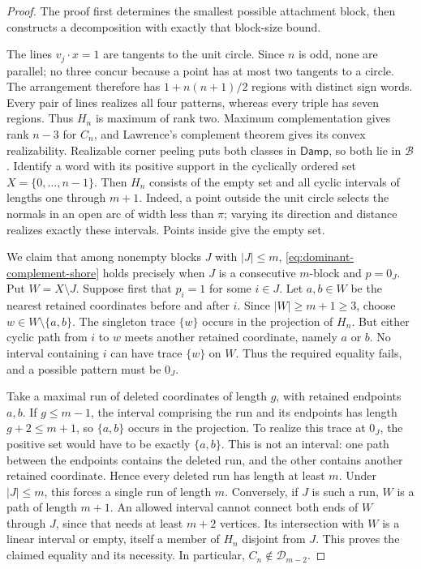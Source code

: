 \documentclass[11pt]{article}
\theoremstyle{definition}
\newcommand{\Damp}{\mathsf{Damp}}
\begin{document}
\begin{proof}
The proof first determines the smallest possible attachment block, then
constructs a decomposition with exactly that block-size bound.

The lines $v_j\cdot x=1$ are tangents to the unit circle. Since $n$
is odd, none are parallel; no three concur because a point has at most
two tangents to a circle. The arrangement therefore has
$1+n(n+1)/2$ regions with distinct sign words. Every pair of lines
realizes all four patterns, whereas every triple has seven regions.
Thus $H_n$ is maximum of rank two. Maximum complementation gives rank
$n-3$ for $C_n$, and Lawrence's complement theorem gives its convex
realizability. Realizable corner peeling puts both classes in $\Damp$,
so both lie in $\mathcal B$.
Identify a word with its positive support in the cyclically ordered set
$X=\{0,\ldots,n-1\}$. Then $H_n$ consists of the empty set and all
cyclic intervals of lengths one through $m+1$. Indeed, a point outside
the unit circle selects the normals in an open arc of width less than
$\pi$; varying its direction and distance realizes exactly these
intervals. Points inside give the empty set.

We claim that among nonempty blocks $J$ with $|J|\le m$,
\eqref{eq:dominant-complement-shore} holds precisely when $J$ is a
consecutive $m$-block and $p=0_J$. Put $W=X\setminus J$.
Suppose first that $p_i=1$ for some $i\in J$. Let $a,b\in W$ be
the nearest retained coordinates before and after $i$. Since
$|W|\ge m+1\ge3$, choose $w\in W\setminus\{a,b\}$.
The singleton trace $\{w\}$ occurs in the projection of $H_n$.
But either cyclic path from $i$ to $w$ meets another retained coordinate,
namely $a$ or $b$. No interval containing $i$ can have trace $\{w\}$
on $W$. Thus the required equality fails, and a possible pattern must
be $0_J$.

Take a maximal run of deleted coordinates of length $g$, with retained
endpoints $a,b$. If $g\le m-1$, the interval comprising the run and
its endpoints has length $g+2\le m+1$, so $\{a,b\}$ occurs in the
projection. To realize this trace at $0_J$, the positive set would
have to be exactly $\{a,b\}$. This is not an interval: one path
between the endpoints contains the deleted run, and the other contains
another retained coordinate. Hence every deleted run has length at
least $m$. Under $|J|\le m$, this forces a single run of length $m$.
Conversely, if $J$ is such a run, $W$ is a path of length $m+1$.
An allowed interval cannot connect both ends of $W$ through $J$, since
that needs at least $m+2$ vertices. Its intersection with $W$ is a
linear interval or empty, itself a member of $H_n$ disjoint from $J$.
This proves the claimed equality and its necessity. In particular,
$C_n\notin\mathcal D_{m-2}$.


\end{proof}
\end{document}

